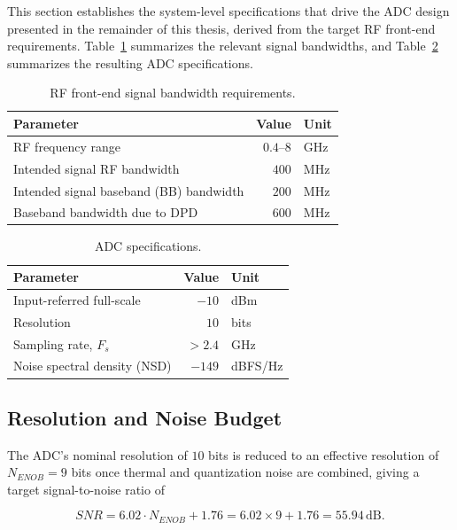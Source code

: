 This section establishes the system-level specifications that drive the
ADC design presented in the remainder of this thesis, derived from the
target RF front-end requirements. Table~\ref{tab:rf_system_specs}
summarizes the relevant signal bandwidths, and
Table~\ref{tab:adc_specs} summarizes the resulting ADC specifications.

\begin{table}[h]
	\centering
	\caption{RF front-end signal bandwidth requirements.}
	\label{tab:rf_system_specs}
	\begin{tabular}{@{}lrl@{}}
		\toprule
		Parameter & Value & Unit \\
		\midrule
		RF frequency range          & $0.4$--$8$ & GHz \\
		Intended signal RF bandwidth & $400$     & MHz \\
		Intended signal baseband (BB) bandwidth & $200$ & MHz \\
		Baseband bandwidth due to DPD & $600$    & MHz \\
		\bottomrule
	\end{tabular}
\end{table}

\begin{table}[h]
	\centering
	\caption{ADC specifications.}
	\label{tab:adc_specs}
	\begin{tabular}{@{}lrl@{}}
		\toprule
		Parameter & Value & Unit \\
		\midrule
		Input-referred full-scale & $-10$  & dBm \\
		Resolution                & $10$   & bits \\
		Sampling rate, $F_s$      & $> 2.4$ & GHz \\
		Noise spectral density (NSD) & $-149$ & dBFS/Hz \\
		\bottomrule
	\end{tabular}
\end{table}

\subsection{Resolution and Noise Budget}

The ADC's nominal resolution of $10$ bits is reduced to an effective
resolution of $N_{ENOB} = 9$ bits once thermal and quantization noise are
combined, giving a target signal-to-noise ratio of

\begin{equation}
	SNR = 6.02 \cdot N_{ENOB} + 1.76 = 6.02 \times 9 + 1.76 =
	55.94\,\text{dB}.
	\label{eq:adc_snr_enob}
\end{equation}

